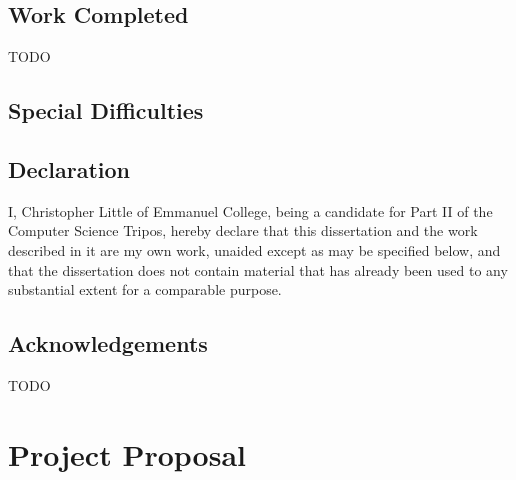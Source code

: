 \documentclass[12pt,a4paper,twoside,openright]{report}
\begin{document}
\section*{Work Completed}
TODO


\section*{Special Difficulties}


\newpage
\section*{Declaration}

I, Christopher Little of Emmanuel College, being a candidate for Part II of the
Computer Science Tripos, hereby declare that this dissertation and the work
described in it are my own work, unaided except as may be specified below, and
that the dissertation does not contain material that has already been used to
any substantial extent for a comparable purpose.

\bigskip
{}

\medskip
{}

\tableofcontents

\listoffigures

\newpage
\section*{Acknowledgements}
TODO


\pagestyle{headings}



\appendix

\chapter{Project Proposal}


\end{document}
